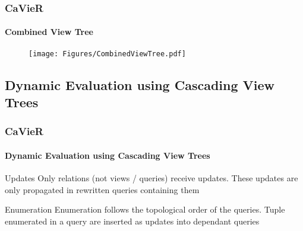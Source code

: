 \documentclass[
	11pt, %
]{beamer}
\begin{document}
\begin{frame}
	\frametitle{CaVieR}
	\framesubtitle{Combined View Tree}
	\begin{figure}
		\begin{minipage}{0.5\textwidth}
		\end{minipage}
		\begin{minipage}{0.45\textwidth}
				\texttt{[image: Figures/CombinedViewTree.pdf]}
		\end{minipage}
		\end{figure}
\end{frame}

\subsection{Dynamic Evaluation using Cascading View Trees}
\begin{frame}
	\frametitle{CaVieR}
	\framesubtitle{Dynamic Evaluation using Cascading View Trees}
	\begin{block}{Updates}
		Only relations (not views / queries) receive updates. These updates are only propagated in rewritten queries containing them
	\end{block}
	\begin{block}{Enumeration}
		Enumeration follows the topological order of the queries. Tuple enumerated in a query are inserted as updates into dependant queries
	\end{block}
\end{frame}
\end{document}
